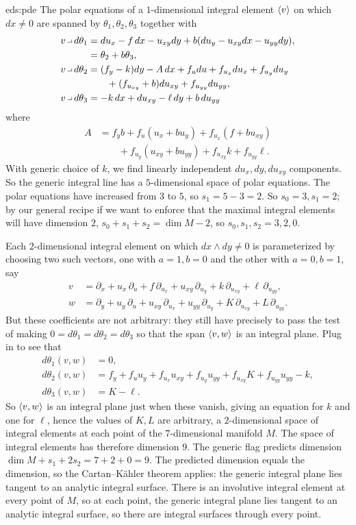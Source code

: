 \begin{answer}{eds:pde}
The polar equations of a \(1\)-dimensional integral element \(\left<v\right>\) on which \(dx\ne 0\) are spanned by \(\theta_1,\theta_2,\theta_3\) together with
\begin{align*}
v\hook d\theta_1&=du_x-f\,dx-u_{xy}dy+b(du_y-u_{xy}dx-u_{yy}dy),\\
&=\theta_2+b\theta_3,\\
v\hook d\theta_2&=(f_y-k)dy-A\,dx+f_u du + f_{u_x} du_x + f_{u_y} du_y\\
&\qquad+ (f_{u_{xy}}+b)du_{xy}+f_{u_{yy}}du_{yy}
,\\
v\hook d\theta_3&=-k\,dx+du_{xy}-\ell\,dy+b\,du_{yy}
\end{align*}
where
\begin{align*}
A&=f_yb+f_u(u_x+bu_y)+f_{u_x}(f+bu_{xy})\\
&\qquad+f_{u_y}(u_{xy}+bu_{yy})+f_{u_{xy}} k +f_{u_{yy}}\ell.
\end{align*}
With generic choice of \(k\), we find linearly independent \(du_x,dy,du_{xy}\) components.
So the generic integral line has a \(5\)-dimensional space of polar equations.
The polar equations have increased from \(3\) to \(5\), so \(s_1=5-3=2\).
So \(s_0=3,s_1=2\); by our general recipe if we want to enforce that the maximal integral elements will have dimension \(2\), \(s_0+s_1+s_2=\dim M-2\), so \(s_0,s_1,s_2=3,2,0\).

Each \(2\)-dimensional integral element on which \(dx\wedge dy\ne 0\) is parameterized by choosing two such vectors, one with \(a=1,b=0\) and the other with \(a=0,b=1\), say
\begin{align*}
v&=\partial_x + u_x\, \partial_u + f \, \partial_{u_x} + u_{xy} \, \partial_{u_y} + k\, \partial_{u_{xy}} + \ell\, \partial_{u_{yy}},\\
w&=\partial_y + u_y\, \partial_u + u_{xy}\, \partial_{u_x} + u_{yy} \, \partial_{u_y} + K\, \partial_{u_{xy}} + L\, \partial_{u_{yy}}.
\end{align*}
But these coefficients are not arbitrary: they still have precisely to pass the test of making \(0=d\theta_1=d\theta_2=d\theta_3\) so that the span \(\left<v,w\right>\) is an integral plane.
Plug in to see that
\begin{align*}
d\theta_1(v,w)&=0,\\
d\theta_2(v,w)&=f_y+f_u u_y + f_{u_x} u_{xy} + f_{u_y} u_{yy} + f_{u_{xy}} K + f_{u_{yy}} u_{yy} -k,\\
d\theta_3(v,w)&=K-\ell.
\end{align*}
So \(\left<v,w\right>\) is an integral plane just when these vanish, giving an equation for \(k\) and one for \(\ell\), hence the values of \(K,L\) are arbitrary, a \(2\)-dimensional space of integral elements at each point of the \(7\)-dimensional manifold \(M\).
The space of integral elements has therefore dimension \(9\).
The generic flag predicts dimension \(\dim M + s_1 + 2s_2=7+2+0=9\).
The predicted dimension equals the dimension, so the Cartan--K\"ahler theorem applies: the generic integral plane lies tangent to an analytic integral surface.
There is an involutive integral element at every point of \(M\), so at each point, the generic integral plane lies tangent to an analytic integral surface, so there are integral surfaces through every point.
\end{answer}
